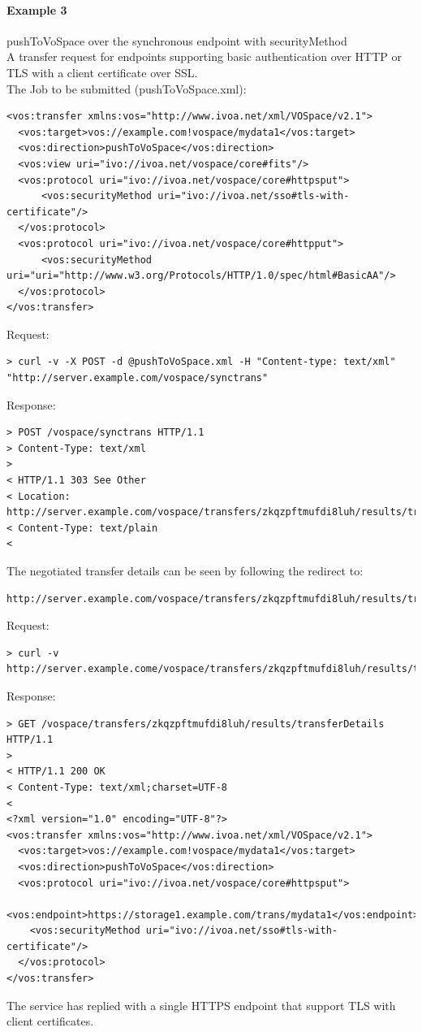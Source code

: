 \documentclass[11pt,a4paper]{ivoa}
\begin{document}
\paragraph{Example 3}
pushToVoSpace over the synchronous endpoint with securityMethod
\\[5px]
\noindent
A transfer request for endpoints supporting basic authentication over HTTP or TLS with a client certificate over SSL.\\
The Job to be submitted (pushToVoSpace.xml):
\begin{lstlisting}
<vos:transfer xmlns:vos="http://www.ivoa.net/xml/VOSpace/v2.1">
  <vos:target>vos://example.com!vospace/mydata1</vos:target>
  <vos:direction>pushToVoSpace</vos:direction>
  <vos:view uri="ivo://ivoa.net/vospace/core#fits"/>
  <vos:protocol uri="ivo://ivoa.net/vospace/core#httpsput">
      <vos:securityMethod uri="ivo://ivoa.net/sso#tls-with-certificate"/>
  </vos:protocol>
  <vos:protocol uri="ivo://ivoa.net/vospace/core#httpput">
      <vos:securityMethod uri="uri="http://www.w3.org/Protocols/HTTP/1.0/spec/html#BasicAA"/>
  </vos:protocol>
</vos:transfer>
\end{lstlisting}
Request:
\begin{lstlisting}
> curl -v -X POST -d @pushToVoSpace.xml -H "Content-type: text/xml" "http://server.example.com/vospace/synctrans"
\end{lstlisting}
Response:
\begin{lstlisting}
> POST /vospace/synctrans HTTP/1.1
> Content-Type: text/xml
>
< HTTP/1.1 303 See Other
< Location: http://server.example.com/vospace/transfers/zkqzpftmufdi8luh/results/transferDetails
< Content-Type: text/plain
<
\end{lstlisting}
The negotiated transfer details can be seen by following the redirect to:
\begin{lstlisting}
http://server.example.com/vospace/transfers/zkqzpftmufdi8luh/results/transferDetails
\end{lstlisting}
Request:
\begin{lstlisting}
> curl -v http://server.example.come/vospace/transfers/zkqzpftmufdi8luh/results/transferDetails
\end{lstlisting}
Response:
\begin{lstlisting}
> GET /vospace/transfers/zkqzpftmufdi8luh/results/transferDetails HTTP/1.1
>
< HTTP/1.1 200 OK
< Content-Type: text/xml;charset=UTF-8
<
<?xml version="1.0" encoding="UTF-8"?>
<vos:transfer xmlns:vos="http://www.ivoa.net/xml/VOSpace/v2.1">
  <vos:target>vos://example.com!vospace/mydata1</vos:target>
  <vos:direction>pushToVoSpace</vos:direction>
  <vos:protocol uri="ivo://ivoa.net/vospace/core#httpsput">
    <vos:endpoint>https://storage1.example.com/trans/mydata1</vos:endpoint>
    <vos:securityMethod uri="ivo://ivoa.net/sso#tls-with-certificate"/>
  </vos:protocol>
</vos:transfer>
\end{lstlisting}
The service has replied with a single HTTPS endpoint that support TLS with client certificates.
\end{document}
